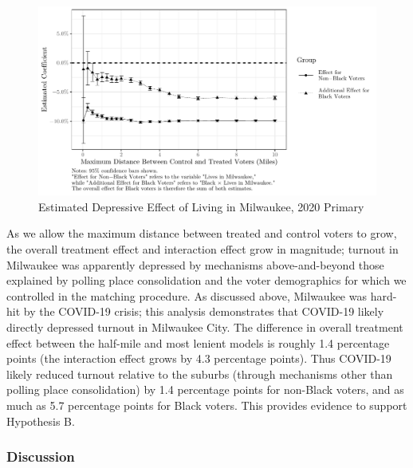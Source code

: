 \documentclass[
  12pt,
]{article}
\begin{document}
\begin{figure}[H]

{\centering \includegraphics{mke_turnout_files/figure-latex/plot-1} 

}

\caption{\label{fig:coef-plot}Estimated Depressive Effect of Living in Milwaukee, 2020 Primary}\label{fig:plot}
\end{figure}

As we allow the maximum distance between treated and control voters to grow, the overall treatment effect and interaction effect grow in magnitude; turnout in Milwaukee was apparently depressed by mechanisms above-and-beyond those explained by polling place consolidation and the voter demographics for which we controlled in the matching procedure. As discussed above, Milwaukee was hard-hit by the COVID-19 crisis; this analysis demonstrates that COVID-19 likely directly depressed turnout in Milwaukee City. The difference in overall treatment effect between the half-mile and most lenient models is roughly 1.4 percentage points (the interaction effect grows by 4.3 percentage points). Thus COVID-19 likely reduced turnout relative to the suburbs (through mechanisms other than polling place consolidation) by 1.4 percentage points for non-Black voters, and as much as 5.7 percentage points for Black voters. This provides evidence to support Hypothesis B.

\hypertarget{discussion}{%
\subsubsection*{Discussion}\label{discussion}}
\end{document}
